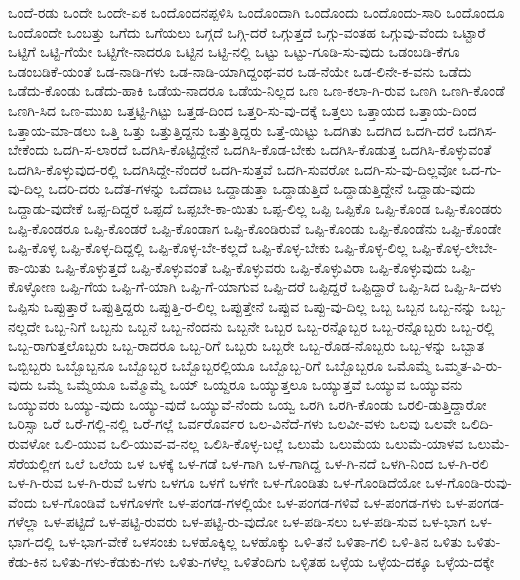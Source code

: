 ಒಂದೆ-ರಡು
ಒಂದೇ
ಒಂದೇ-ಏಕ
ಒಂದೊಂದನಪ್ಪಳಿಸಿ
ಒಂದೊಂದಾಗಿ
ಒಂದೊಂದು
ಒಂದೊಂದು-ಸಾರಿ
ಒಂದೊಂದೂ
ಒಂದೊಂದೇ
ಒಂಬತ್ತು
ಒಗೆದು
ಒಗೆಯಲು
ಒಗ್ಗದೆ
ಒಗ್ಗಿ-ದರೆ
ಒಗ್ಗುತ್ತದೆ
ಒಗ್ಗು-ವಂತಹ
ಒಗ್ಗುವು-ವೆಂದು
ಒಟ್ಟಾರೆ
ಒಟ್ಟಿಗೆ
ಒಟ್ಟಿ-ಗೆಯೇ
ಒಟ್ಟಿಗೇ-ನಾದರೂ
ಒಟ್ಟಿನ
ಒಟ್ಟಿ-ನಲ್ಲಿ
ಒಟ್ಟು
ಒಟ್ಟು-ಗೂಡಿ-ಸು-ವುದು
ಒಡಂಬಡಿ-ಕೆಗೂ
ಒಡಂಬಡಿಕೆ-ಯಂತೆ
ಒಡ-ನಾಡಿ-ಗಳು
ಒಡ-ನಾಡಿ-ಯಾಗಿದ್ದಂಥ-ವರ
ಒಡ-ನೆಯೇ
ಒಡ-ಲಿನೇ-ಕ-ವನು
ಒಡೆದು
ಒಡೆದು-ಕೊಂಡು
ಒಡೆದು-ಹಾಕಿ
ಒಡೆಯ-ನಾದರೂ
ಒಡೆಯ-ನಿಲ್ಲದ
ಒಣ
ಒಣ-ಕಲಾ-ಗಿ-ರುವ
ಒಣಗಿ
ಒಣಗಿ-ಕೊಂಡೆ
ಒಣಗಿ-ಸಿದ
ಒಣ-ಮುಖ
ಒತ್ತಟ್ಟಿ-ಗಿಟ್ಟು
ಒತ್ತಡ-ದಿಂದ
ಒತ್ತರಿ-ಸು-ವು-ದಕ್ಕೆ
ಒತ್ತಲು
ಒತ್ತಾಯದ
ಒತ್ತಾಯ-ದಿಂದ
ಒತ್ತಾಯ-ಮಾ-ಡಲು
ಒತ್ತಿ
ಒತ್ತು
ಒತ್ತುತ್ತಿದ್ದನು
ಒತ್ತುತ್ತಿದ್ದರು
ಒತ್ತೆ-ಯಿಟ್ಟು
ಒದಗಿತು
ಒದಗಿದ
ಒದಗಿ-ದರೆ
ಒದಗಿಸ-ಬೇಕೆಂದು
ಒದಗಿ-ಸ-ಲಾರದೆ
ಒದಗಿಸಿ-ಕೊಟ್ಟಿದ್ದೇನೆ
ಒದಗಿಸಿ-ಕೊಡ-ಬೇಕು
ಒದಗಿಸಿ-ಕೊಡುತ್ತ
ಒದಗಿಸಿ-ಕೊಳ್ಳುವಂತೆ
ಒದಗಿಸಿ-ಕೊಳ್ಳುವುದ-ರಲ್ಲಿ
ಒದಗಿಸಿದ್ದೇ-ನೆಂದರೆ
ಒದಗಿ-ಸುತ್ತವೆ
ಒದಗಿ-ಸುವರೋ
ಒದಗಿ-ಸು-ವು-ದಿಲ್ಲವೋ
ಒದ-ಗು-ವು-ದಿಲ್ಲ
ಒದರಿ-ದರು
ಒದೆತ-ಗಳನ್ನು
ಒದೆದಾಟ
ಒದ್ದಾಡುತ್ತಾ
ಒದ್ದಾಡುತ್ತಿದೆ
ಒದ್ದಾಡುತ್ತಿದ್ದೇನೆ
ಒದ್ದಾಡು-ವುದು
ಒದ್ದಾಡು-ವುದೇಕೆ
ಒಪ್ಪ-ದಿದ್ದರೆ
ಒಪ್ಪದೆ
ಒಪ್ಪಬೇ-ಕಾ-ಯಿತು
ಒಪ್ಪ-ಲಿಲ್ಲ
ಒಪ್ಪಿ
ಒಪ್ಪಿಕೊ
ಒಪ್ಪಿ-ಕೊಂಡ
ಒಪ್ಪಿ-ಕೊಂಡರು
ಒಪ್ಪಿ-ಕೊಂಡರೂ
ಒಪ್ಪಿ-ಕೊಂಡರೆ
ಒಪ್ಪಿ-ಕೊಂಡಾಗ
ಒಪ್ಪಿ-ಕೊಂಡಿರುವೆ
ಒಪ್ಪಿ-ಕೊಂಡು
ಒಪ್ಪಿ-ಕೊಂಡೆನು
ಒಪ್ಪಿ-ಕೊಂಡೇ
ಒಪ್ಪಿ-ಕೊಳ್ಳ
ಒಪ್ಪಿ-ಕೊಳ್ಳ-ದಿದ್ದಲ್ಲಿ
ಒಪ್ಪಿ-ಕೊಳ್ಳ-ಬೇ-ಕಲ್ಲದೆ
ಒಪ್ಪಿ-ಕೊಳ್ಳ-ಬೇಕು
ಒಪ್ಪಿ-ಕೊಳ್ಳ-ಲಿಲ್ಲ
ಒಪ್ಪಿ-ಕೊಳ್ಳ-ಲೇಬೇ-ಕಾ-ಯಿತು
ಒಪ್ಪಿ-ಕೊಳ್ಳುತ್ತದೆ
ಒಪ್ಪಿ-ಕೊಳ್ಳುವಂತೆ
ಒಪ್ಪಿ-ಕೊಳ್ಳುವರು
ಒಪ್ಪಿ-ಕೊಳ್ಳುವಿರಾ
ಒಪ್ಪಿ-ಕೊಳ್ಳುವುದು
ಒಪ್ಪಿ-ಕೊಳ್ಳೋಣ
ಒಪ್ಪಿ-ಗೆಯ
ಒಪ್ಪಿ-ಗೆ-ಯಾಗಿ
ಒಪ್ಪಿ-ಗೆ-ಯಾಗುವ
ಒಪ್ಪಿ-ದರೆ
ಒಪ್ಪಿದ್ದರೆ
ಒಪ್ಪಿದ್ದಾರೆ
ಒಪ್ಪಿ-ಸಿದ
ಒಪ್ಪಿ-ಸಿ-ದಳು
ಒಪ್ಪಿಸು
ಒಪ್ಪುತ್ತಾರೆ
ಒಪ್ಪುತ್ತಿದ್ದರು
ಒಪ್ಪುತ್ತಿ-ರ-ಲಿಲ್ಲ
ಒಪ್ಪುತ್ತೇನೆ
ಒಪ್ಪುವ
ಒಪ್ಪು-ವು-ದಿಲ್ಲ
ಒಬ್ಬ
ಒಬ್ಬನ
ಒಬ್ಬ-ನನ್ನು
ಒಬ್ಬ-ನಲ್ಲದೇ
ಒಬ್ಬ-ನಿಗೆ
ಒಬ್ಬನು
ಒಬ್ಬನೆ
ಒಬ್ಬ-ನೆಂದನು
ಒಬ್ಬನೇ
ಒಬ್ಬರ
ಒಬ್ಬ-ರನ್ನೊಬ್ಬರ
ಒಬ್ಬ-ರನ್ನೊಬ್ಬರು
ಒಬ್ಬ-ರಲ್ಲಿ
ಒಬ್ಬ-ರಾಗುತ್ತಲೊಬ್ಬರು
ಒಬ್ಬ-ರಾದರೂ
ಒಬ್ಬ-ರಿಗೆ
ಒಬ್ಬರು
ಒಬ್ಬರೇ
ಒಬ್ಬ-ರೊಡ-ನೊಬ್ಬರು
ಒಬ್ಬ-ಳನ್ನು
ಒಬ್ಬಾತ
ಒಬ್ಬಿಬ್ಬರು
ಒಬ್ಬೊಬ್ಬನೂ
ಒಬ್ಬೊಬ್ಬರ
ಒಬ್ಬೊಬ್ಬರಲ್ಲಿಯೂ
ಒಬ್ಬೊಬ್ಬ-ರಿಗೆ
ಒಬ್ಬೊಬ್ಬರೂ
ಒಮೊಮ್ಮೆ
ಒಮ್ಮತ-ವಿ-ರು-ವುದು
ಒಮ್ಮೆ
ಒಮ್ಮೆಯೂ
ಒಮ್ಮೊಮ್ಮೆ
ಒಯ್
ಒಯ್ದರೂ
ಒಯ್ಯುತ್ತಲೂ
ಒಯ್ಯುತ್ತವೆ
ಒಯ್ಯುವ
ಒಯ್ಯುವನು
ಒಯ್ಯುವರು
ಒಯ್ಯು-ವುದು
ಒಯ್ಯು-ವುದೆ
ಒಯ್ಯುವೆ-ನೆಂದು
ಒಯ್ವ
ಒರಗಿ
ಒರಗಿ-ಕೊಂಡು
ಒರಲಿ-ಡುತ್ತಿದ್ದಾರೋ
ಒರಿಸ್ಸಾ
ಒರೆ
ಒರೆ-ಗಲ್ಲಿ-ನಲ್ಲಿ
ಒರೆ-ಗಲ್ಲೆ
ಒರ್ವರೊರ್ವರ
ಒಲ-ವಿನೆದೆ-ಗಳು
ಒಲವೀ-ವಳು
ಒಲವು
ಒಲವೇ
ಒಲಿದಿ-ರುವಳೋ
ಒಲಿ-ಯುವ
ಒಲಿ-ಯುವ-ವ-ನಲ್ಲ
ಒಲಿಸಿ-ಕೊಳ್ಳ-ಬಲ್ಲೆ
ಒಲುಮೆ
ಒಲುಮೆಯ
ಒಲುಮೆ-ಯಾಳವ
ಒಲುಮೆ-ಸೆರೆಯಲ್ಲೀಗ
ಒಲೆ
ಒಲೆಯ
ಒಳ
ಒಳಕ್ಕೆ
ಒಳ-ಗಡೆ
ಒಳ-ಗಾಗಿ
ಒಳ-ಗಾಗಿದ್ದ
ಒಳ-ಗಿ-ನದೆ
ಒಳಗಿ-ನಿಂದ
ಒಳ-ಗಿ-ರಲಿ
ಒಳ-ಗಿ-ರುವ
ಒಳ-ಗಿ-ರುವೆ
ಒಳಗು
ಒಳಗೂ
ಒಳಗೆ
ಒಳಗೇ
ಒಳ-ಗೊಂಡಿತು
ಒಳ-ಗೊಂಡಿದೆಯೋ
ಒಳ-ಗೊಂಡಿ-ರುವು-ವೆಂದು
ಒಳ-ಗೊಂಡಿವೆ
ಒಳಗೊಳಗೇ
ಒಳ-ಪಂಗಡ-ಗಳಲ್ಲಿಯೇ
ಒಳ-ಪಂಗಡ-ಗಳಿವೆ
ಒಳ-ಪಂಗಡ-ಗಳು
ಒಳ-ಪಂಗಡ-ಗಳೆಲ್ಲಾ
ಒಳ-ಪಟ್ಟಿದೆ
ಒಳ-ಪಟ್ಟಿ-ರುವರು
ಒಳ-ಪಟ್ಟಿ-ರು-ವುದೋ
ಒಳ-ಪಡಿ-ಸಲು
ಒಳ-ಪಡಿ-ಸುವ
ಒಳ-ಭಾಗ
ಒಳ-ಭಾಗ-ದಲ್ಲಿ
ಒಳ-ಭಾಗ-ವೇಕೆ
ಒಳಸಂಚು
ಒಳಹೊಕ್ಕಿಲ್ಲ
ಒಳಹೊಕ್ಕು
ಒಳಿ-ತನೆ
ಒಳಿತಾ-ಗಲಿ
ಒಳಿ-ತಿನ
ಒಳಿತು
ಒಳಿತು-ಕೆಡು-ಕಿನ
ಒಳಿತು-ಗಳು-ಕೆಡುಕು-ಗಳು
ಒಳಿತು-ಗಳೆಲ್ಲ
ಒಳಿತೆಂದಿಗು
ಒಳ್ಳಿತಹ
ಒಳ್ಳೆಯ
ಒಳ್ಳೆಯ-ದಕ್ಕೂ
ಒಳ್ಳೆಯ-ದಕ್ಕೇ
